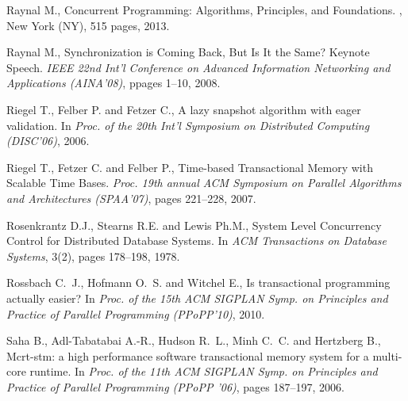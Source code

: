 \begin{thebibliography}{99}
{
Raynal  M.,
\newblock Concurrent Programming: Algorithms, Principles, and Foundations.
, New York (NY), 515 pages, 2013.

Raynal  M.,
Synchronization is Coming Back, But Is It the Same?
Keynote Speech. {\it  IEEE 22nd Int'l Conference on Advanced 
Information  Networking and Applications (AINA'08)},  ppages 1--10, 2008. 




Riegel T., Felber P. and Fetzer C.,
\newblock A lazy snapshot algorithm with eager validation.
\newblock In {\em Proc. of the 20th Int'l Symposium on Distributed Computing (DISC'06)}, 2006.


Riegel T., Fetzer C. and Felber P.,
Time-based Transactional Memory with Scalable Time Bases.
{\em  Proc.   19th  annual  ACM   Symposium  on  Parallel   Algorithms  and
Architectures (SPAA'07)}, pages 221--228, 2007.



Rosenkrantz D.J.,  Stearns R.E. and Lewis Ph.M., 
System Level Concurrency Control for Distributed Database Systems.
In {\it  ACM Transactions on  Database Systems},  3(2), pages 178--198, 1978.



Rossbach C.~J., Hofmann O.~S. and Witchel E.,
\newblock Is transactional programming actually easier?
\newblock In {\em Proc. of the 15th ACM SIGPLAN Symp. on Principles and
  Practice of Parallel Programming (PPoPP'10)}, 2010.


Saha B., Adl-Tabatabai A.-R., Hudson R.~L., Minh C.~C. and
  Hertzberg B.,
\newblock Mcrt-stm: a high performance software transactional memory system for
  a multi-core runtime.
\newblock In {\em Proc. of the 11th ACM SIGPLAN Symp.
  on Principles and Practice of Parallel Programming (PPoPP '06)}, pages 187--197, 2006.




}
\end{thebibliography}
